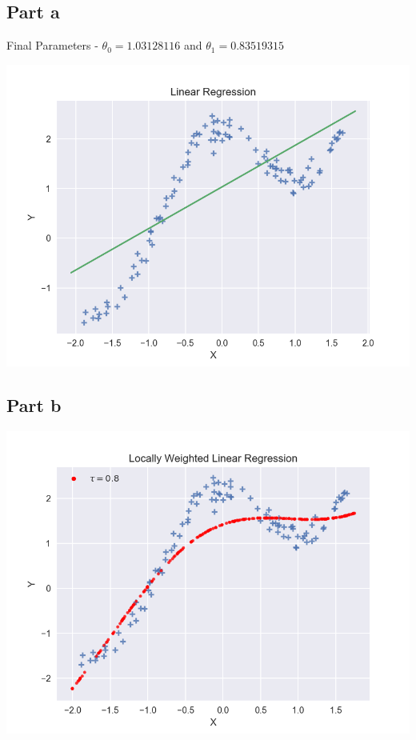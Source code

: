 \documentclass[12pt]{article}
\begin{document}
\subsection*{Part a}
\begin{addmargin}[0.3in]{0in}
Final Parameters - $\theta_0 = 1.03128116$ and $\theta_1 = 0.83519315$
\end{addmargin}
\begin{center}
\includegraphics[scale=0.45]{localweight1.png}
\end{center}
\subsection*{Part b}
\begin{center}
\includegraphics[scale=0.45]{localweight2.png}
\end{center}
\end{document}
